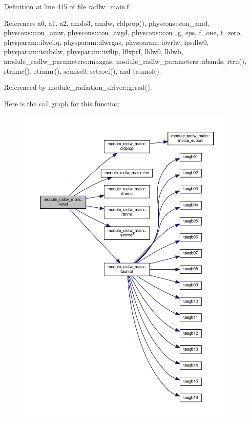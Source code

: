 Definition at line 415 of file radlw\+\_\+main.\+f.



References a0, a1, a2, amdo3, amdw, cldprop(), physcons\+::con\+\_\+amd, physcons\+::con\+\_\+amw, physcons\+::con\+\_\+avgd, physcons\+::con\+\_\+g, eps, f\+\_\+one, f\+\_\+zero, physparam\+::ilwcliq, physparam\+::ilwrgas, physparam\+::iovrlw, ipsdlw0, physparam\+::isubclw, physparam\+::ivflip, lflxprf, lhlw0, lhlwb, module\+\_\+radlw\+\_\+parameters\+::maxgas, module\+\_\+radlw\+\_\+parameters\+::nbands, rtrn(), rtrnmc(), rtrnmr(), semiss0, setcoef(), and taumol().



Referenced by module\+\_\+radiation\+\_\+driver\+::grrad().



Here is the call graph for this function\+:
\nopagebreak
\begin{figure}[H]
\begin{center}
\leavevmode
\includegraphics[width=350pt]{namespacemodule__radlw__main_a072a355f2067d729d64d2997270e36b1_cgraph}
\end{center}
\end{figure}




